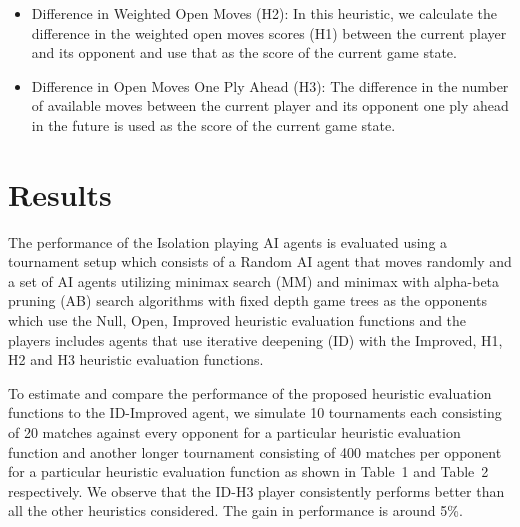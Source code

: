 \documentclass{article} %
\begin{document}
\begin{itemize}
    \item Difference in Weighted Open Moves (H2): In this heuristic, we calculate the difference in the weighted open moves scores (H1) between the current player and its opponent and use that as the score of the current game state.

    \item Difference in Open Moves One Ply Ahead (H3): The difference in the number of available moves between the current player and its opponent one ply ahead in the future is used as the score of the current game state.

\end{itemize}

\section{Results}
\label{sec:results}
The performance of the Isolation playing AI agents is evaluated using a tournament setup which consists of a Random AI agent that moves randomly and a set of AI agents utilizing minimax search (MM) and minimax with alpha-beta pruning (AB) search algorithms with fixed depth game trees as the opponents which use the Null, Open, Improved heuristic evaluation functions and the players includes agents that use iterative deepening (ID) with the Improved, H1, H2 and H3 heuristic evaluation functions.

To estimate and compare the performance of the proposed heuristic evaluation functions to the \mbox{ID-Improved} agent, we simulate 10 tournaments each consisting of 20 matches against every opponent for a particular heuristic evaluation function and another longer tournament consisting of 400 matches per opponent for a particular heuristic evaluation function as shown in Table~1 and Table~2 respectively. We observe that the ID-H3 player consistently performs better than all the other heuristics considered. The gain in performance is around 5\%.
\end{document}
